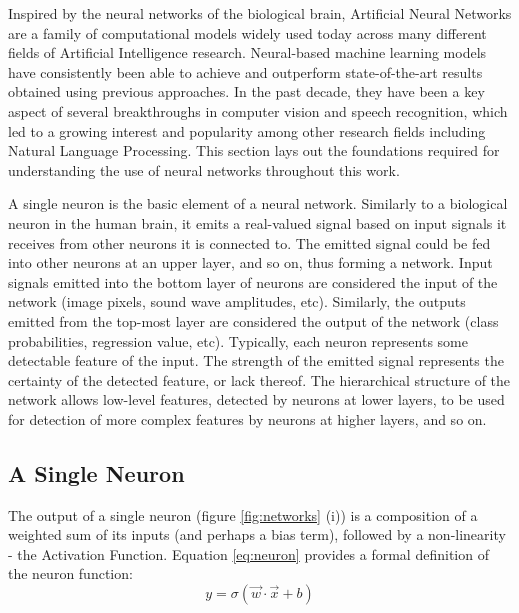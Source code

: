 Inspired by the neural networks of the biological brain, Artificial Neural Networks are a family of computational models widely used today across many different fields of Artificial Intelligence research. Neural-based machine learning models have consistently been able to achieve and outperform state-of-the-art results obtained using previous approaches. In the past decade, they have been a key aspect of several breakthroughs in computer vision and speech recognition, which led to a growing interest and popularity among other research fields including Natural Language Processing. This section lays out the foundations required for understanding the use of neural networks throughout this work.

\medskip

A single neuron is the basic element of a neural network. Similarly to a biological neuron in the human brain, it emits a real-valued signal based on input signals it receives from other neurons it is connected to. The emitted signal could be fed into other neurons at an upper layer, and so on, thus forming a network. Input signals emitted into the bottom layer of neurons are considered the input of the network (image pixels, sound wave amplitudes, etc). Similarly, the outputs emitted from the top-most layer are considered the output of the network (class probabilities, regression value, etc). Typically, each neuron represents some detectable feature of the input. The strength of the emitted signal represents the certainty of the detected feature, or lack thereof. The hierarchical structure of the network allows low-level features, detected by neurons at lower layers, to be used for detection of more complex features by neurons at higher layers, and so on.

\medskip

\subsection{A Single Neuron}

The output of a single neuron (figure \ref{fig:networks} (i)) is a composition of a weighted sum of its inputs (and perhaps a bias term), followed by a non-linearity - the Activation Function. Equation \ref{eq:neuron} provides a formal definition of the neuron function:
\begin{equation}
y = \sigma(\vec{w}\cdot\vec{x} + b)
\label{eq:neuron}
\end{equation}

